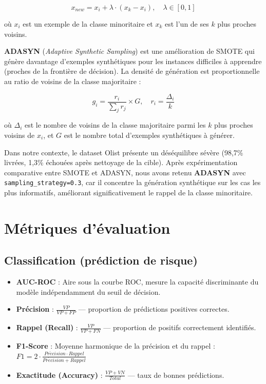 \documentclass[12pt,a4paper]{report}
\begin{document}
\begin{equation}
x_{new} = x_i + \lambda \cdot (x_{k} - x_i), \quad \lambda \in [0, 1]
\end{equation}

o\`{u} $x_i$ est un exemple de la classe minoritaire et $x_k$ est l'un de ses $k$ plus proches voisins.

\textbf{ADASYN} (\textit{Adaptive Synthetic Sampling}) \cite{he2008adasyn} est une am\'{e}lioration de SMOTE qui g\'{e}n\`{e}re davantage d'exemples synth\'{e}tiques pour les instances difficiles \`{a} apprendre (proches de la fronti\`{e}re de d\'{e}cision). La densit\'{e} de g\'{e}n\'{e}ration est proportionnelle au ratio de voisins de la classe majoritaire :

\begin{equation}
g_i = \frac{r_i}{\sum_{j} r_j} \times G, \quad r_i = \frac{\Delta_i}{k}
\end{equation}

o\`{u} $\Delta_i$ est le nombre de voisins de la classe majoritaire parmi les $k$ plus proches voisins de $x_i$, et $G$ est le nombre total d'exemples synth\'{e}tiques \`{a} g\'{e}n\'{e}rer.

Dans notre contexte, le dataset Olist pr\'{e}sente un d\'{e}s\'{e}quilibre s\'{e}v\`{e}re (98,7\% livr\'{e}es, 1,3\% \'{e}chou\'{e}es apr\`{e}s nettoyage de la cible). Apr\`{e}s exp\'{e}rimentation comparative entre SMOTE et ADASYN, nous avons retenu \textbf{ADASYN} avec \texttt{sampling\_strategy=0.3}, car il concentre la g\'{e}n\'{e}ration synth\'{e}tique sur les cas les plus informatifs, am\'{e}liorant significativement le rappel de la classe minoritaire.

\section{M\'{e}triques d'\'{e}valuation}

\subsection{Classification (pr\'{e}diction de risque)}

\begin{itemize}
  \item \textbf{AUC-ROC} : Aire sous la courbe ROC, mesure la capacit\'{e} discriminante du mod\`{e}le ind\'{e}pendamment du seuil de d\'{e}cision.
  \item \textbf{Pr\'{e}cision} : $\frac{VP}{VP + FP}$ --- proportion de pr\'{e}dictions positives correctes.
  \item \textbf{Rappel (Recall)} : $\frac{VP}{VP + FN}$ --- proportion de positifs correctement identifi\'{e}s.
  \item \textbf{F1-Score} : Moyenne harmonique de la pr\'{e}cision et du rappel : $F1 = 2 \cdot \frac{Pr\acute{e}cision \cdot Rappel}{Pr\acute{e}cision + Rappel}$
  \item \textbf{Exactitude (Accuracy)} : $\frac{VP + VN}{Total}$ --- taux de bonnes pr\'{e}dictions.
\end{itemize}
\end{document}

